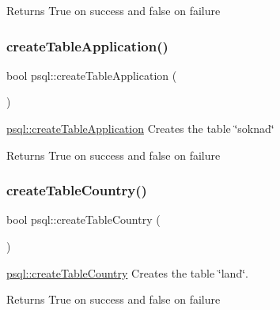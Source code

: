 \begin{DoxyReturn}{Returns}
True on success and false on failure 
\end{DoxyReturn}
\mbox{\label{classpsql_a36f6a197a2214b9c71cfcd620334835d}} 
\subsubsection{\texorpdfstring{create\+Table\+Application()}{createTableApplication()}}
{\footnotesize\ttfamily bool psql\+::create\+Table\+Application (\begin{DoxyParamCaption}{ }\end{DoxyParamCaption})}



\mbox{\hyperlink{classpsql_a36f6a197a2214b9c71cfcd620334835d}{psql\+::create\+Table\+Application}} Creates the table \char`\"{}soknad\char`\"{} 

\begin{DoxyReturn}{Returns}
True on success and false on failure 
\end{DoxyReturn}
\mbox{\label{classpsql_ab6e496d8471f3cd9c5c082a6ba75c25b}} 
\subsubsection{\texorpdfstring{create\+Table\+Country()}{createTableCountry()}}
{\footnotesize\ttfamily bool psql\+::create\+Table\+Country (\begin{DoxyParamCaption}{ }\end{DoxyParamCaption})}



\mbox{\hyperlink{classpsql_ab6e496d8471f3cd9c5c082a6ba75c25b}{psql\+::create\+Table\+Country}} Creates the table \char`\"{}land\char`\"{}. 

\begin{DoxyReturn}{Returns}
True on success and false on failure 
\end{DoxyReturn}
\mbox{\label{classpsql_a427ad0f483c8ab7a4d23912278bc69e8}} 
